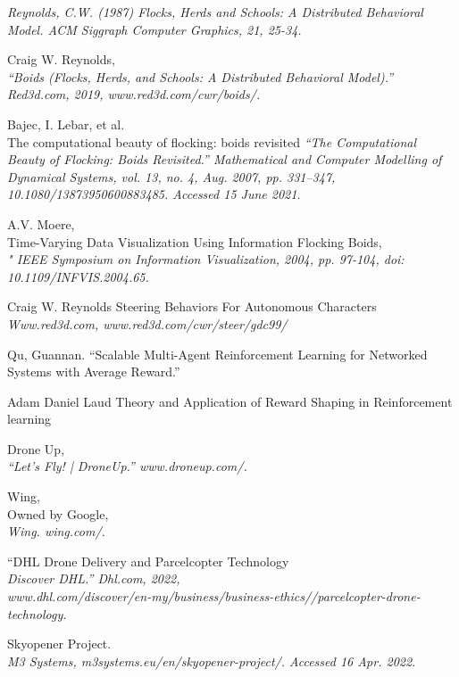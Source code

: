 \begin{thebibliography}{9}

\textit{Reynolds, C.W. (1987) Flocks, Herds and Schools: A Distributed Behavioral Model. ACM Siggraph Computer Graphics, 21, 25-34.}

Craig W. Reynolds,\\
\textit{“Boids (Flocks, Herds, and Schools: A Distributed Behavioral
Model).” Red3d.com, 2019, www.red3d.com/cwr/boids/.}

Bajec, I. Lebar, et al.\\
The computational beauty of flocking: boids revisited
\textit{“The Computational Beauty of Flocking: Boids Revisited.” Mathematical and Computer Modelling of Dynamical Systems, vol. 13, no. 4, Aug. 2007, pp. 331–347, 10.1080/13873950600883485. Accessed 15 June 2021.}

A.V. Moere,\\
Time-Varying Data Visualization Using Information Flocking Boids,\hfill\\
\textit{  " IEEE Symposium on Information Visualization, 2004, pp. 97-104, doi: 10.1109/INFVIS.2004.65.}

Craig W. Reynolds
Steering Behaviors For Autonomous Characters
\textit{Www.red3d.com, www.red3d.com/cwr/steer/gdc99/}

  Qu, Guannan. “Scalable Multi-Agent Reinforcement Learning for Networked Systems with Average Reward.” 
 
 Adam Daniel Laud
Theory and Application of Reward Shaping in Reinforcement learning

Drone Up,\\
\textit{“Let’s Fly! | DroneUp.” www.droneup.com/.} 

Wing,\\
Owned by Google,\\
\textit{Wing. wing.com/.}

“DHL Drone Delivery and Parcelcopter Technology\\
\textit{Discover DHL.” Dhl.com, 2022, \\ www.dhl.com/discover/en-my/business/business-ethics//parcelcopter-drone-technology.\hfill}

Skyopener Project.\\
\textit{M3 Systems, m3systems.eu/en/skyopener-project/. Accessed 16 Apr. 2022.} 


\end{thebibliography}
